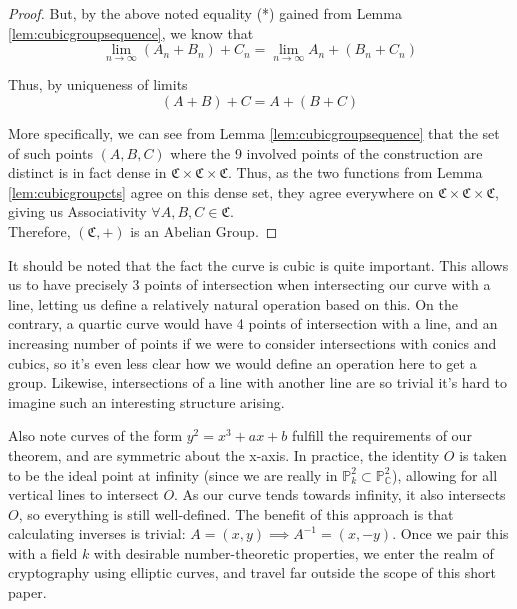 \begin{proof}
But, by the above noted equality (*) gained from Lemma \ref{lem:cubicgroupsequence},
we know that 
\[
	\lim_{n \to \infty} (A_n + B_n) + C_n = \lim_{n \to \infty} A_n + (B_n + C_n) 
\]

Thus, by uniqueness of limits
\[
	(A+B)+C = A+(B+C)
\]


More specifically, we can see from Lemma \ref{lem:cubicgroupsequence} that the set of
such points $(A,B,C)$ where the 9 involved points of the construction are distinct
is in fact dense in $\mathfrak{C} \times \mathfrak{C} \times \mathfrak{C}$. Thus,
as the two functions from Lemma \ref{lem:cubicgroupcts} agree on this
dense set, they agree everywhere on $\mathfrak{C} \times \mathfrak{C} \times \mathfrak{C}$,
giving us Associativity $\forall A,B,C \in \mathfrak{C}$.\\

Therefore, $(\mathfrak{C},+)$ is an Abelian Group.
\end{proof}

It should be noted that the fact the curve is cubic is quite important.
This allows us to have precisely 3 points of intersection when intersecting
our curve with a line, letting us define a relatively natural
operation based on this. On the contrary, a quartic curve would have 4
points of intersection with a line, and an increasing number of points
if we were to consider intersections with conics and cubics, so 
it's even less clear how we would define an operation here to get a group.
Likewise, intersections of a line with another line are so trivial
it's hard to imagine such an interesting structure arising.

Also note curves of the form $y^2 = x^3 + ax + b$ fulfill the requirements
of our theorem, and are symmetric about the x-axis. In practice,
the identity $O$ is taken to be the ideal point at infinity (since we are
really in $\mathbb{P}^2_k \subset \mathbb{P}^2_\mathbb{C}$), allowing
for all vertical lines to intersect $O$. As our curve tends towards
infinity, it also intersects $O$, so everything is still well-defined.
The benefit of this approach is that calculating inverses is trivial:
$A=(x,y) \implies A^{-1} = (x, -y)$. Once we pair this with a field $k$
with desirable number-theoretic properties, we enter the realm of
cryptography using elliptic curves, and travel far outside the
scope of this short paper.
